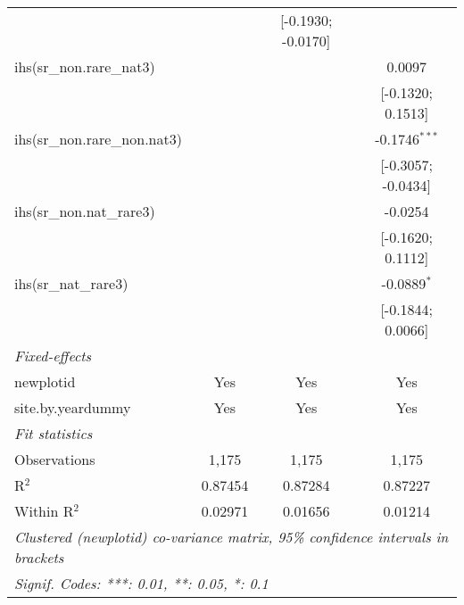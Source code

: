 \begin{table}[htbp]
\begin{tabular}{lccc}
                                    &                    & [-0.1930; -0.0170] &   \\   
      ihs(sr\_non.rare\_nat3)       &                    &                    & 0.0097\\   
                                    &                    &                    & [-0.1320; 0.1513]\\   
      ihs(sr\_non.rare\_non.nat3)   &                    &                    & -0.1746$^{***}$\\   
                                    &                    &                    & [-0.3057; -0.0434]\\   
      ihs(sr\_non.nat\_rare3)       &                    &                    & -0.0254\\   
                                    &                    &                    & [-0.1620; 0.1112]\\   
      ihs(sr\_nat\_rare3)           &                    &                    & -0.0889$^{*}$\\   
                                    &                    &                    & [-0.1844; 0.0066]\\   
      \midrule
      \emph{Fixed-effects}\\
      newplotid                     & Yes                & Yes                & Yes\\  
      site.by.yeardummy             & Yes                & Yes                & Yes\\  
      \midrule
      \emph{Fit statistics}\\
      Observations                  & 1,175              & 1,175              & 1,175\\  
      R$^2$                         & 0.87454            & 0.87284            & 0.87227\\  
      Within R$^2$                  & 0.02971            & 0.01656            & 0.01214\\  
      \midrule \midrule
      \multicolumn{4}{l}{\emph{Clustered (newplotid) co-variance matrix, 95\% confidence intervals in brackets}}\\
      \multicolumn{4}{l}{\emph{Signif. Codes: ***: 0.01, **: 0.05, *: 0.1}}\\
   \end{tabular}
\end{table}


